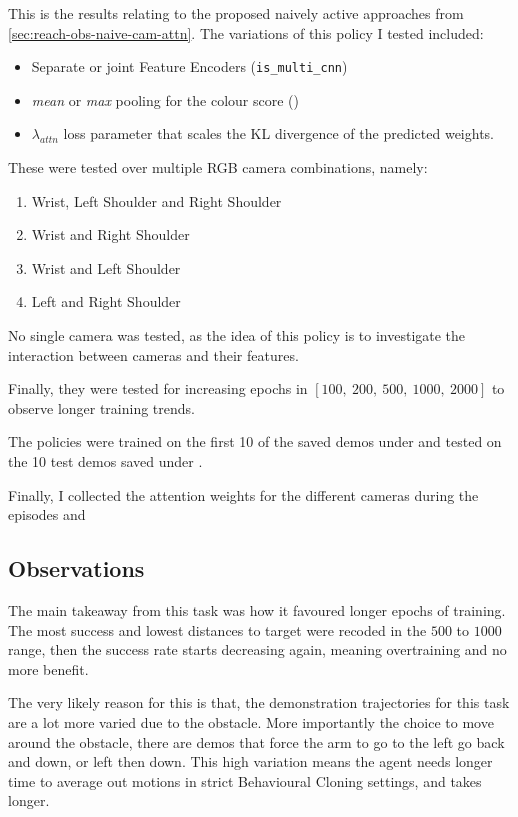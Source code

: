 
This is the results relating to the proposed naively active approaches from \ref{sec:reach-obs-naive-cam-attn}.
The variations of this policy I tested included: 
\begin{itemize}
  \item Separate or joint Feature Encoders (\verb|is_multi_cnn|)
  \item \emph{mean} or \emph{max} pooling for the colour score (\verb||)
  \item $\lambda_{attn}$ loss parameter that scales the KL divergence of the predicted 
  weights.
\end{itemize}
These were tested over multiple RGB camera combinations, namely:
\begin{enumerate}
  \item Wrist, Left Shoulder and Right Shoulder
  \item Wrist and Right Shoulder
  \item Wrist and Left Shoulder
  \item Left and Right Shoulder
\end{enumerate}
No single camera was tested, as the idea of this policy is to investigate the interaction between cameras and their features.

Finally, they were tested for increasing epochs in \(\left[100, ~200, ~500, ~1000, ~2000\right]\) to observe longer training trends.

The policies were trained on the first 10 of the saved demos under  and tested on the 10 test demos saved under .

Finally, I collected the attention weights for the different cameras during the episodes and 

\subsection{Observations}
The main takeaway from this task was how it favoured longer epochs of training. The most success and lowest distances to target were recoded in the $500$ to $1000$ range, then the success rate starts decreasing again, meaning overtraining and no more benefit.\todo[color=purple]{}

The very likely reason for this is that, the demonstration trajectories for this task are a lot more varied due to the obstacle. More importantly the choice to move around the obstacle, there are demos that force the arm to go to the left go back and down, or left then down. This high variation means the agent needs longer time to average out motions in strict Behavioural Cloning settings, and takes longer.


